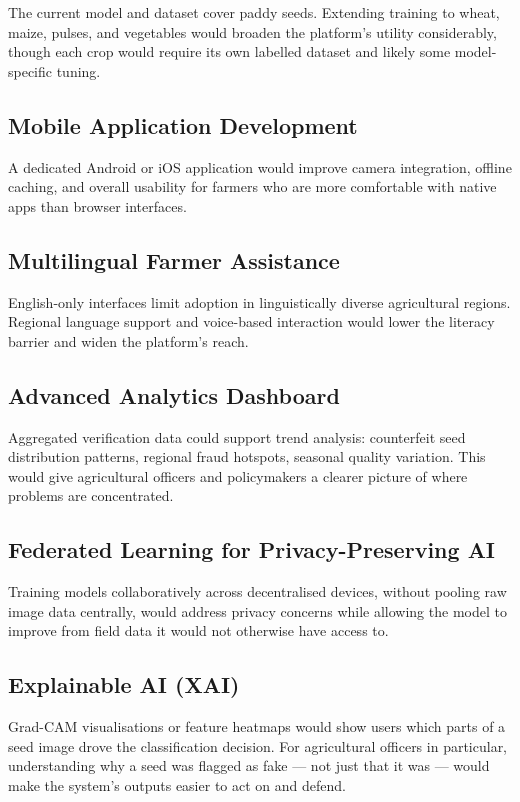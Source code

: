 The current model and dataset cover paddy seeds. Extending training to wheat, maize, pulses, and vegetables would broaden the platform's utility considerably, though each crop would require its own labelled dataset and likely some model-specific tuning.

\subsection{Mobile Application Development}

A dedicated Android or iOS application would improve camera integration, offline caching, and overall usability for farmers who are more comfortable with native apps than browser interfaces.

\subsection{Multilingual Farmer Assistance}

English-only interfaces limit adoption in linguistically diverse agricultural regions. Regional language support and voice-based interaction would lower the literacy barrier and widen the platform's reach.

\subsection{Advanced Analytics Dashboard}

Aggregated verification data could support trend analysis: counterfeit seed distribution patterns, regional fraud hotspots, seasonal quality variation. This would give agricultural officers and policymakers a clearer picture of where problems are concentrated.

\subsection{Federated Learning for Privacy-Preserving AI}

Training models collaboratively across decentralised devices, without pooling raw image data centrally, would address privacy concerns while allowing the model to improve from field data it would not otherwise have access to.

\subsection{Explainable AI (XAI)}

Grad-CAM visualisations or feature heatmaps would show users which parts of a seed image drove the classification decision. For agricultural officers in particular, understanding why a seed was flagged as fake --- not just that it was --- would make the system's outputs easier to act on and defend.

